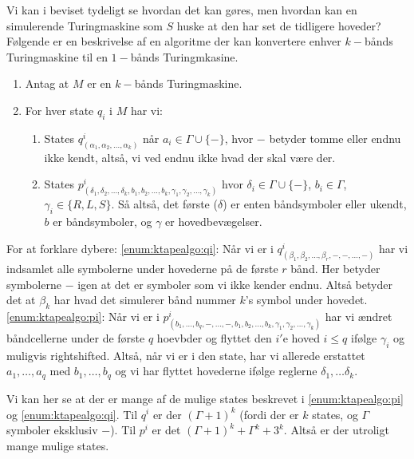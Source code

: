 Vi kan i beviset tydeligt se hvordan det kan gøres, men hvordan kan en simulerende Turingmaskine som $S$ huske at den har set de tidligere hoveder? Følgende er en beskrivelse af en algoritme der kan konvertere enhver $k-$bånds Turingmaskine til en $1-$bånds Turingmkasine.

\begin{enumerate}
	\item Antag at $M$ er en $k-$bånds Turingmaskine.
	\item For hver state $q_{i}$ i $M$ har vi:
	      \begin{enumerate}
		      \item\label{enum:ktapealgo:qi} States $q^{i}_{(\alpha_{1}, \alpha_{2}, \ldots, \alpha_{k})}$ når $a_{i} \in \Gamma \cup \{-\}$, hvor $-$ betyder tomme eller endnu ikke kendt, altså, vi ved endnu ikke hvad der skal være der.
		      \item\label{enum:ktapealgo:pi} States $p^{i}_{(\delta_{1}, \delta_{2}, \ldots, \delta_{k}, b_{1}, b_{2}, \ldots, b_{k}, \gamma_{1}, \gamma_{2}, \ldots, \gamma_{k})}$ hvor $\delta_{i} \in \Gamma \cup \{-\}$, $b_{i} \in \Gamma$, $\gamma_{i} \in \{R, L, S\}$. Så altså, det første (\(\delta\)) er enten båndsymboler eller ukendt, $b$  er båndsymboler,  og $\gamma$ er hovedbevægelser.
	      \end{enumerate}
\end{enumerate}

For at forklare dybere: \ref{enum:ktapealgo:qi}: Når vi er i $q^{i}_{(\beta_{1}, \beta_{2}, \ldots, \beta_{r},-,-,\ldots,-)}$ har vi indsamlet alle symbolerne under hovederne på de første $r$ bånd. Her betyder symbolerne $-$ igen at det er symboler som vi ikke kender endnu. Altså betyder det at \(\beta_{k}\) har hvad det simulerer bånd nummer $k$'s symbol under hovedet.
\ref{enum:ktapealgo:pi}: Når vi er i $p^{i}_{(b_{1}, \ldots, b_{q}, -, \ldots, -, b_{1}, b_{2}, \ldots, b_k, \gamma_{1}, \gamma_{2}, \ldots, \gamma_{k})}$ har vi ændret båndcellerne under de første $q$ hoevbder og flyttet den $i'$e hoved $i \le q$ ifølge $\gamma_{i}$ og muligvis rightshifted. Altså, når vi er i den state, har vi allerede erstattet $a_{1}, \ldots, a_{q}$ med $b_{1}, \ldots, b_{q}$ og vi har flyttet hovederne ifølge reglerne $\delta_{1}, \ldots \delta_{k}$.

Vi kan her se at der  er mange af de mulige states beskrevet i \ref{enum:ktapealgo:pi} og \ref{enum:ktapealgo:qi}. Til $q^{i}$ er der $(\Gamma+1)^{k}$ (fordi der er $k$ states, og $\Gamma$ symboler eksklusiv $-$). Til $p^{i}$ er det $(\Gamma+1)^{k} + \Gamma^{k} + 3^{k}$. Altså er der utroligt mange mulige states.

